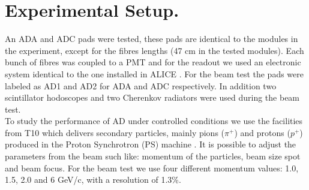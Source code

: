 \section{Experimental Setup.} \label{cap:ExpSetup}

An ADA and ADC pads were tested, these pads are identical to the modules in the experiment, except for the fibres lengths (47 cm in the tested modules). Each bunch of fibres was coupled to a PMT and for the readout we used an electronic system identical to the one installed in ALICE \cite{Zoccarato}. For the beam test the pads were labeled as AD1 and AD2 for ADA and ADC respectively. In addition two scintillator hodoscopes and two Cherenkov  radiators were used during the beam test. %
\\
To study the performance of AD under controlled conditions we use the facilities from T10 \cite{t10BeamArea} which delivers secondary particles, mainly pions ($\pi^{+}$) and protons ($p^{+}$) produced in the Proton Synchrotron (PS) machine \cite{Simon:PS,psBeam}. It is possible to adjust the parameters from the beam such like: momentum of the particles, beam size spot and beam focus. For the beam test we use four different momentum values: 1.0, 1.5, 2.0 and 6 GeV/c, with a resolution of 1.3\%.

